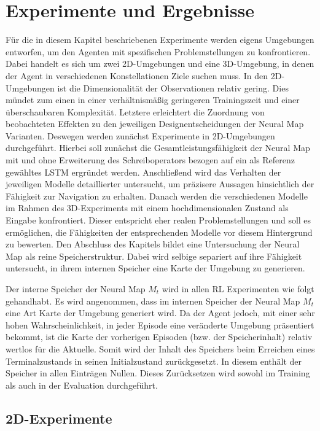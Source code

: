 \chapter{Experimente und Ergebnisse}
\label{chap_exp}

Für die in diesem Kapitel beschriebenen Experimente werden eigens Umgebungen entworfen, um den Agenten mit spezifischen Problemstellungen zu konfrontieren. Dabei handelt es sich um zwei 2D-Umgebungen und eine 3D-Umgebung, in denen der Agent in verschiedenen Konstellationen Ziele suchen muss. In den 2D-Umgebungen ist die Dimensionalität der Observationen relativ gering. Dies mündet zum einen in einer verhältnismäßig geringeren Trainingszeit und einer überschaubaren Komplexität. Letztere erleichtert die Zuordnung von beobachteten Effekten zu den jeweiligen Designentscheidungen der Neural Map Varianten. Deswegen werden zunächst Experimente in 2D-Umgebungen durchgeführt. Hierbei soll zunächst die Gesamtleistungsfähigkeit der Neural Map mit und ohne Erweiterung des Schreiboperators bezogen auf ein als Referenz gewähltes LSTM ergründet werden. Anschließend wird das Verhalten der jeweiligen Modelle detaillierter untersucht, um präzisere Aussagen hinsichtlich der Fähigkeit zur Navigation zu erhalten. Danach werden die verschiedenen Modelle im Rahmen des 3D-Experiments mit einem hochdimensionalen Zustand als Eingabe konfrontiert. Dieser entspricht eher realen Problemstellungen und soll es ermöglichen,  die Fähigkeiten der entsprechenden Modelle vor diesem Hintergrund zu bewerten. Den Abschluss des Kapitels bildet eine Untersuchung der Neural Map als reine Speicherstruktur. Dabei wird selbige separiert auf ihre Fähigkeit untersucht, in ihrem internen Speicher eine Karte der Umgebung zu generieren.

Der interne Speicher der Neural Map $M_t$ wird in allen RL Experimenten wie folgt gehandhabt. Es wird angenommen, dass im internen Speicher der Neural Map $M_t$ eine Art Karte der Umgebung generiert wird. Da der Agent jedoch, mit einer sehr hohen Wahrscheinlichkeit, in jeder Episode eine veränderte Umgebung präsentiert bekommt, ist die Karte der vorherigen Episoden (bzw. der Speicherinhalt) relativ wertlos für die Aktuelle. Somit wird der Inhalt des Speichers beim Erreichen eines Terminalzustands in seinen Initialzustand zurückgesetzt. In diesem enthält der Speicher in allen Einträgen Nullen. Dieses Zurücksetzen wird sowohl im Training als auch in der Evaluation durchgeführt.

\section{2D-Experimente}
\label{sec_2d_exp}

